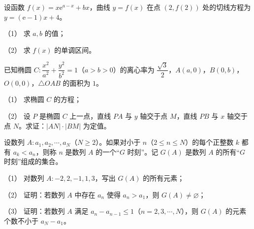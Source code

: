 \begin{question}
设函数 \(f(x)=x\mathrm{e}^{a-x}+bx\)，曲线 \(y=f(x)\) 在点 \((2,f(2))\) 处的切线方程为 \(y=(\mathrm{e}-1)x+4\)。

（1） 求 \(a,b\) 的值；

（2） 求 \(f(x)\) 的单调区间。

\end{question}
\begin{question}
已知椭圆 \(C:\dfrac{x^{2}}{a^{2}}+\dfrac{y^{2}}{b^{2}}=1\)（\(a>b>0\)）的离心率为 \(\dfrac{\sqrt{3}}{2}\)，\(A(a,0)\)，\(B(0,b)\)，\(O(0,0)\)，\(\triangle OAB\) 的面积为 \(1\)。

（1） 求椭圆 \(C\) 的方程；

（2） 设 \(P\) 是椭圆 \(C\) 上一点，直线 \(PA\) 与 \(y\) 轴交于点 \(M\)，直线 \(PB\) 与 \(x\) 轴交于点 \(N\)。求证：\(|AN|\cdot|BM|\) 为定值。

\end{question}
\begin{question}
设数列 \(A:a_{1},a_{2},\cdots,a_{N}\)（\(N\geqslant 2\)）。如果对小于 \(n\)（\(2\leqslant n\leqslant N\)）的每个正整数 \(k\) 都有 \(a_{k}<a_{n}\)，则称 \(n\) 是数列 \(A\) 的一个“\(G\) 时刻”。记 \(G(A)\) 是数列 \(A\) 的所有“\(G\) 时刻”组成的集合。

（1） 对数列 \(A:-2,2,-1,1,3\)，写出 \(G(A)\) 的所有元素；

（2） 证明：若数列 \(A\) 中存在 \(a_{n}\) 使得 \(a_{n}>a_{1}\)，则 \(G(A)\neq\varnothing\)；

（3） 证明：若数列 \(A\) 满足 \(a_{n}-a_{n-1}\leqslant 1\)（\(n=2,3,\cdots,N\)），则 \(G(A)\) 的元素个数不小于 \(a_{N}-a_{1}\)。

\end{question}